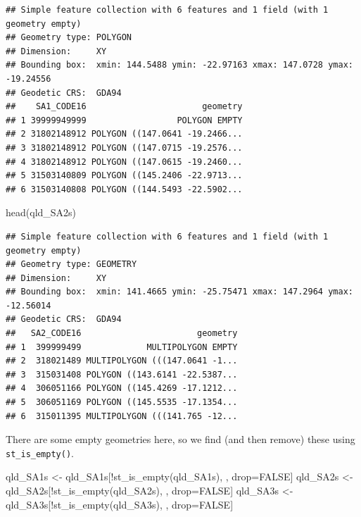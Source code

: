 \documentclass[
]{book}
\newenvironment{Shaded}{\begin{snugshade}}{\end{snugshade}}
\newcommand{\ConstantTok}[1]{\textcolor[rgb]{0.00,0.00,0.00}{#1}}
\newcommand{\FunctionTok}[1]{\textcolor[rgb]{0.00,0.00,0.00}{#1}}
\newcommand{\NormalTok}[1]{#1}
\newcommand{\OtherTok}[1]{\textcolor[rgb]{0.56,0.35,0.01}{#1}}
\newcommand{\SpecialCharTok}[1]{\textcolor[rgb]{0.00,0.00,0.00}{#1}}
\begin{document}
\begin{verbatim}
## Simple feature collection with 6 features and 1 field (with 1 geometry empty)
## Geometry type: POLYGON
## Dimension:     XY
## Bounding box:  xmin: 144.5488 ymin: -22.97163 xmax: 147.0728 ymax: -19.24556
## Geodetic CRS:  GDA94
##    SA1_CODE16                       geometry
## 1 39999949999                  POLYGON EMPTY
## 2 31802148912 POLYGON ((147.0641 -19.2466...
## 3 31802148912 POLYGON ((147.0715 -19.2576...
## 4 31802148912 POLYGON ((147.0615 -19.2460...
## 5 31503140809 POLYGON ((145.2406 -22.9713...
## 6 31503140808 POLYGON ((144.5493 -22.5902...
\end{verbatim}

\begin{Shaded}
\begin{Highlighting}[]
\FunctionTok{head}\NormalTok{(qld\_SA2s)}
\end{Highlighting}
\end{Shaded}

\begin{verbatim}
## Simple feature collection with 6 features and 1 field (with 1 geometry empty)
## Geometry type: GEOMETRY
## Dimension:     XY
## Bounding box:  xmin: 141.4665 ymin: -25.75471 xmax: 147.2964 ymax: -12.56014
## Geodetic CRS:  GDA94
##   SA2_CODE16                       geometry
## 1  399999499             MULTIPOLYGON EMPTY
## 2  318021489 MULTIPOLYGON (((147.0641 -1...
## 3  315031408 POLYGON ((143.6141 -22.5387...
## 4  306051166 POLYGON ((145.4269 -17.1212...
## 5  306051169 POLYGON ((145.5535 -17.1354...
## 6  315011395 MULTIPOLYGON (((141.765 -12...
\end{verbatim}

There are some empty geometries here, so we find (and then remove) these using \texttt{st\_is\_empty()}.

\begin{Shaded}
\begin{Highlighting}[]
\NormalTok{qld\_SA1s }\OtherTok{\textless{}{-}}\NormalTok{ qld\_SA1s[}\SpecialCharTok{!}\FunctionTok{st\_is\_empty}\NormalTok{(qld\_SA1s), , drop}\OtherTok{=}\ConstantTok{FALSE}\NormalTok{]}
\NormalTok{qld\_SA2s }\OtherTok{\textless{}{-}}\NormalTok{ qld\_SA2s[}\SpecialCharTok{!}\FunctionTok{st\_is\_empty}\NormalTok{(qld\_SA2s), , drop}\OtherTok{=}\ConstantTok{FALSE}\NormalTok{]}
\NormalTok{qld\_SA3s }\OtherTok{\textless{}{-}}\NormalTok{ qld\_SA3s[}\SpecialCharTok{!}\FunctionTok{st\_is\_empty}\NormalTok{(qld\_SA3s), , drop}\OtherTok{=}\ConstantTok{FALSE}\NormalTok{]}
\end{Highlighting}
\end{Shaded}
\end{document}
